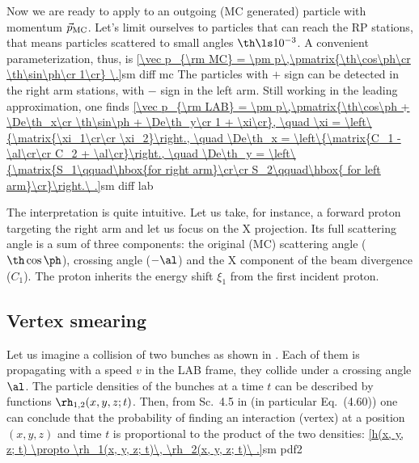 Now we are ready to apply  to an outgoing (MC generated) particle with momentum $\vec p_{\rm MC}$. Let's limit ourselves to particles that can reach the RP stations, that means particles scattered to small angles $\th \ls 10^{-3}$. A convenient parameterization, thus, is
\eqref{\vec p_{\rm MC} = \pm p\,\pmatrix{\th\cos\ph\cr \th\sin\ph\cr 1\cr} \.}{sm diff mc}
The particles with $+$ sign can be detected in the right arm stations, with $-$ sign in the left arm. Still working in the leading approximation, one finds
\eqref{\vec p_{\rm LAB} = \pm p\,\pmatrix{\th\cos\ph + \De\th_x\cr \th\sin\ph + \De\th_y\cr 1 + \xi\cr},
\quad \xi = \left\{\matrix{\xi_1\cr\cr \xi_2}\right.,
\quad \De\th_x = \left\{\matrix{C_1 - \al\cr\cr C_2 + \al\cr}\right.,
\quad \De\th_y = \left\{\matrix{S_1\qquad\hbox{for right arm}\cr\cr S_2\qquad\hbox{ for left arm}\cr}\right.\ .}{sm diff lab} %

The interpretation is quite intuitive. Let us take, for instance, a forward proton targeting the right arm and let us focus on the X projection. Its full scattering angle is a sum of three components: the original (MC) scattering angle ($\th\cos\ph$), crossing angle ($-\al$) and the X component of the beam divergence ($C_1$). The proton inherits the energy shift $\xi_1$ from the first incident proton.

\iffalse
Using the statistical properties suggested in the previous section yields the following relation between variances (recalling $\si_\th$ refers to the beam divergence)
\eqref{\si_{\De\th_x} = \si_{\De\th_y} = \si_{C_1} = \si_{C_2} = \si_{S_1} = \si_{S_2} = \cases{
{\si_\th\over\sqrt2}\qquad\hbox{for parameterization \Eq{mom par 1}}\cr
\si_\th\qquad\hbox{for parameterization \Eq{mom par 2}}\cr
}\ .}{delta th sigma}
\fi


\subsection{Vertex smearing}


Let us imagine a collision of two bunches as shown in . Each of them is propagating with a speed $v$ in the LAB frame, they collide under a crossing angle $\al$. The particle densities of the bunches at a time $t$ can be described by functions $\rh_{1, 2}(x, y, z; t)$. Then, from Sc.~4.5 in  (in particular Eq.~(4.60)) one can conclude that the probability of finding an interaction (vertex) at a position $(x, y, z)$ and time $t$ is proportional to the product of the two densities:
\eqref{h(x, y, z; t) \propto \rh_1(x, y, z; t)\, \rh_2(x, y, z; t)\ .}{sm pdf2}

